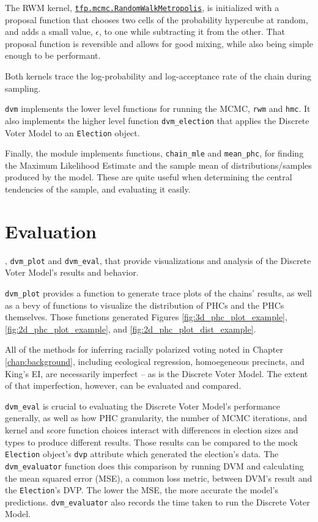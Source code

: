 The RWM kernel, \href{https://www.tensorflow.org/probability/api_docs/python/tfp/mcmc/RandomWalkMetropolis}{\texttt{tfp.mcmc.RandomWalkMetropolis}}, is initialized with a proposal function that chooses two cells of the probability hypercube at random, and adds a small value, $\epsilon$, to one while subtracting it from the other. That proposal function is reversible and allows for good mixing, while also being simple enough to be performant.

Both kernels trace the log-probability and log-acceptance rate of the chain during sampling.

\texttt{dvm} implements the lower level functions for running the MCMC, \texttt{rwm} and \texttt{hmc}. It also implements the higher level function \texttt{dvm\_election} that applies the Discrete Voter Model to an \texttt{Election} object.

Finally, the module implements functions, \texttt{chain\_mle} and \texttt{mean\_phc}, for finding the Maximum Likelihood Estimate and the sample mean of distributions/samples produced by the model. These are quite useful when determining the central tendencies of the sample, and evaluating it easily.


\section{Evaluation}
\label{sec:eval}

, \texttt{dvm\_plot} and \texttt{dvm\_eval}, that provide visualizations and analysis of the Discrete Voter Model's results and behavior.

\texttt{dvm\_plot} provides a function to generate trace plots of the chains' results, as well as a bevy of functions to visualize the distribution of PHCs and the PHCs themselves. Those functions generated Figures \ref{fig:3d_phc_plot_example}, \ref{fig:2d_phc_plot_example}, and \ref{fig:2d_phc_plot_dist_example}.

All of the methods for inferring racially polarized voting noted in Chapter \ref{chap:background}, including ecological regression, homoegeneous precincts, and King's EI, are necessarily imperfect -- as is the Discrete Voter Model. The extent of that imperfection, however, can be evaluated and compared.

\texttt{dvm\_eval} is crucial to evaluating the Discrete Voter Model's performance generally, as well as how PHC granularity, the number of MCMC iterations, and kernel and score function choices interact with differences in election sizes and types to produce different results. Those results can be compared to the mock \texttt{Election} object's \texttt{dvp} attribute which generated the election's data. The \texttt{dvm\_evaluator} function does this comparison by running DVM and calculating the mean squared error (MSE), a common loss metric, between DVM's result and the \texttt{Election}'s DVP. The lower the MSE, the more accurate the model's predictions. \texttt{dvm\_evaluator} also records the time taken to run the Discrete Voter Model.

